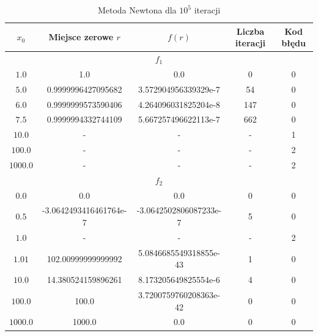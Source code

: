 \documentclass[12pt]{article}
\begin{document}
\begin{table}[h!]
	\centering
    \label{tab:table4}
    \begin{tabular}{c|c|c|c|c}
		$x_0$ & Miejsce zerowe $r$ & $f(r)$ & Liczba iteracji & Kod błędu \\
 		\hline
 		\hline
 		\multicolumn{5}{c}{$f_1$}\\
 		\hline
 		\hline
		$1.0$ & 1.0 & 0.0 & 0 & 0\\
		\hline
		$5.0$ & 0.9999996427095682 & 3.572904956339329e-7 & 54 & 0\\
		\hline
		$6.0$ & 0.9999999573590406 & 4.264096031825204e-8 & 147 & 0\\
		\hline
		$7.5$ & 0.9999994332744109 & 5.667257496622113e-7 & 662 & 0\\
		\hline
		$10.0$ & - & - & - & 1 \\
		\hline
		$100.0$ & - & - & - & 2 \\
		\hline
		$1000.0$ & - & - & - & 2 \\
		\hline
		\hline
		\hline
 		\multicolumn{5}{c}{$f_2$}\\
 		\hline
 		\hline
 		$0.0$ & 0.0 & 0.0 & 0 & 0\\
 		\hline
 		$0.5$ & -3.0642493416461764e-7 & -3.0642502806087233e-7 & 5 & 0\\
 		\hline
 		$1.0$ & - & - & - & 2 \\
 		\hline
 		$1.01$ & 102.00999999999992 & 5.0846685549318855e-43 & 1 & 0\\
 		\hline
 		$10.0$ & 14.380524159896261 & 8.173205649825554e-6 & 4 & 0\\
 		\hline
 		$100.0$ & 100.0 & 3.7200759760208363e-42 & 0 & 0\\
 		\hline
 		$1000.0$ & 1000.0 & 0.0 & 0 & 0\\

 		\hline
    \end{tabular}
	\caption{Metoda Newtona dla $10^5$ iteracji}
\end{table}
\end{document}
